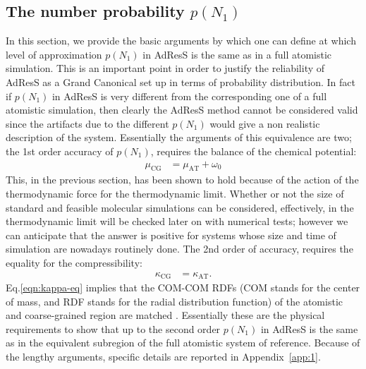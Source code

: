 \documentclass[aip,jcp,a4paper,reprint,onecolumn]{revtex4-1}
\newcommand{\redc}[1]{{\color{red} #1}}
\newcommand{\AT}{{\textrm{{AT}}}}
\newcommand{\CG}{{\textrm{CG}}}
\begin{document}
\subsection{The number probability $p(N_1)$}
\label{sec:pn1}
In this section, we provide the basic arguments by which one can define at which level of approximation $p(N_{1})$
in AdResS is the same as in a full atomistic simulation. This is an important point
in order to justify the reliability of AdResS as a Grand
Canonical set up in terms of probability distribution. In fact if
$p(N_{1})$ in AdResS is very different from the corresponding one of a
full atomistic simulation, then clearly the AdResS method cannot be
considered valid since the artifacts due to the
different $p(N_{1})$ would give a non realistic description of the
system.
Essentially the arguments of this equivalence are two; the 1st order accuracy of  $p(N_{1})$, requires the balance of the chemical potential:
\begin{align}\label{eqn:mu-eq}
  \mu_{\CG} &= \mu_{\AT} + \omega_0
\end{align}
This, in the previous section, has been shown to hold because of the action of the thermodynamic force for the thermodynamic limit. 
Whether or not the size of standard and feasible molecular simulations can be considered, effectively, in the thermodynamic limit will be checked later on with numerical tests; however we can anticipate that the answer is positive for systems whose size and time of simulation are nowadays routinely done.
The 2nd order of accuracy, requires the equality for the compressibility:
\begin{align}\label{eqn:kappa-eq}
  \kappa_{\CG} &= \kappa_{\AT}.
\end{align}
Eq.\ref{eqn:kappa-eq} implies that the \redc{COM-COM RDFs (COM stands for the center of mass, and RDF stands for the radial distribution function)} of the atomistic and coarse-grained region are matched \cite{han}.
Essentially these are the physical requirements to show that up to the second order $p(N_1)$ in AdResS is the same as in the equivalent subregion of the full atomistic system of reference.
Because of the lengthy arguments, specific details are reported in Appendix~\ref{app:1}.
\end{document}
